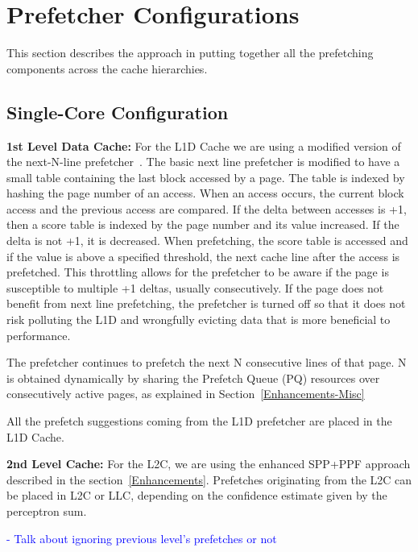 \section{Prefetcher Configurations}
\label{Config}

This section describes the approach in putting together all the
prefetching components across the cache hierarchies.

\subsection{Single-Core Configuration}
\label{Config-Single}

\noindent \textbf{1st Level Data Cache:} For the L1D Cache we are
using a modified version of the next-N-line prefetcher~\cite{nextn}.
The basic next line prefetcher is modified to have a small table
containing the last block accessed by a page. The table is indexed by
hashing the page number of an access.  When an access occurs, the
current block access and the previous access are compared.  If the
delta between accesses is +1, then a score table is indexed by the
page number and its value increased. If the delta is not +1, it is
decreased. When prefetching, the score table is accessed and if the
value is above a specified threshold, the next cache line after the
access is prefetched. This throttling allows for the prefetcher to be
aware if the page is susceptible to multiple +1 deltas, usually
consecutively. If the page does not benefit from next line
prefetching, the prefetcher is turned off so that it does not risk
polluting the L1D and wrongfully evicting data that is more beneficial
to performance.

The prefetcher continues to prefetch the next N consecutive lines of
that page. N is obtained dynamically by sharing the Prefetch Queue
(PQ) resources over consecutively active pages, as explained in
Section~\ref{Enhancements-Misc}

All the prefetch suggestions coming from the L1D prefetcher are placed
in the L1D Cache.

\noindent \textbf{2nd Level Cache:} For the L2C, we are using the
enhanced SPP+PPF approach described in the
section~\ref{Enhancements}. Prefetches originating from the L2C can be
placed in L2C or LLC, depending on the confidence estimate given by
the perceptron sum.

\textcolor{blue}{ - Talk about ignoring previous level's prefetches or
  not
}

